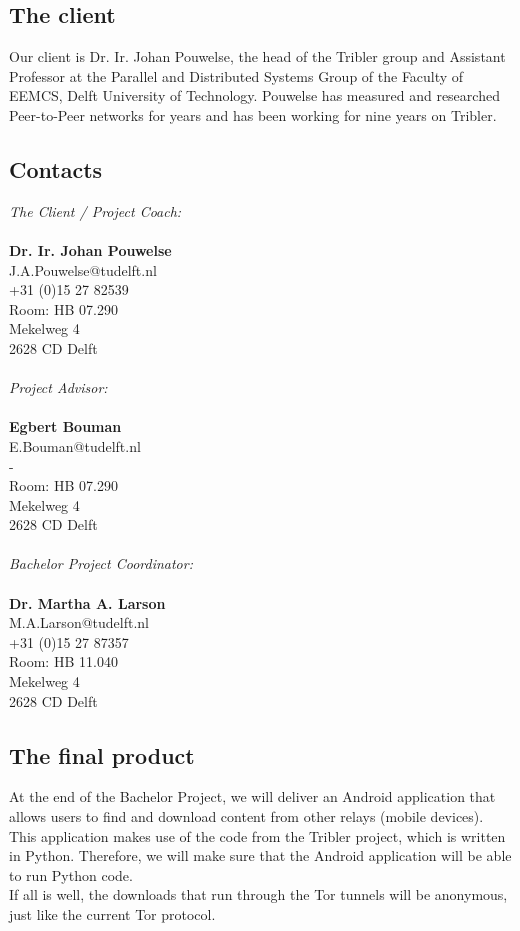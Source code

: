 \subsection{The client}
Our client is Dr. Ir. Johan Pouwelse, the head of the Tribler group and Assistant Professor at the Parallel and Distributed Systems Group of the Faculty of EEMCS, Delft University of Technology. Pouwelse has measured and researched Peer-to-Peer networks for years and has been working for nine years on Tribler.

\subsection{Contacts}

\emph{The Client / Project Coach:}\\\\
\textbf{Dr. Ir. Johan Pouwelse}\\
J.A.Pouwelse@tudelft.nl\\
+31 (0)15 27 82539\\
Room: HB 07.290\\
Mekelweg 4\\
2628 CD Delft\\\\

\emph{Project Advisor:}\\\\
\textbf{Egbert Bouman}\\
E.Bouman@tudelft.nl\\ 
-\\
Room: HB 07.290\\
Mekelweg 4\\
2628 CD Delft\\\\

\emph{Bachelor Project Coordinator:}\\\\
\textbf{Dr. Martha A. Larson}\\
M.A.Larson@tudelft.nl\\
+31 (0)15 27 87357\\
Room: HB 11.040\\
Mekelweg 4\\
2628 CD Delft\\

\subsection{The final product}
At the end of the Bachelor Project, we will deliver an Android application that allows users to find and download content from other relays (mobile devices). This application makes use of the code from the Tribler project, which is written in Python. Therefore, we will make sure that the Android application will be able to run Python code.\\
If all is well, the downloads that run through the Tor tunnels will be anonymous, just like the current Tor protocol.

